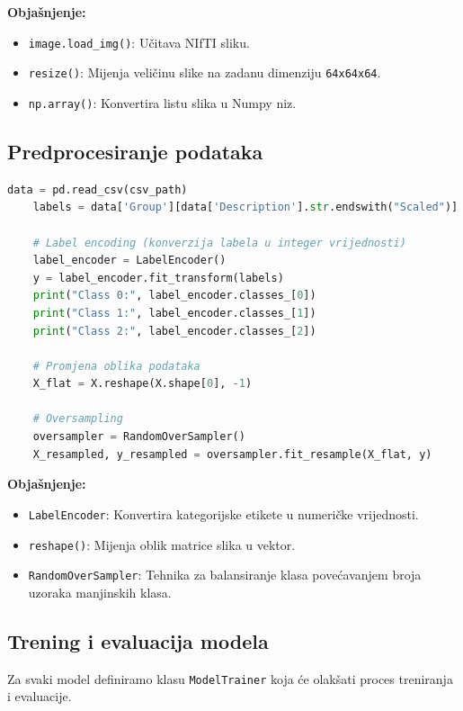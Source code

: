 \documentclass[zavrsnirad]{fer}
\begin{document}
\noindent \textbf{Objašnjenje:}
\begin{itemize}
	\item \texttt{image.load\_img()}: Učitava NIfTI sliku.
	\item \texttt{resize()}: Mijenja veličinu slike na zadanu dimenziju \texttt{64x64x64}.
	\item \texttt{np.array()}: Konvertira listu slika u Numpy niz.
\end{itemize}

\subsection{Predprocesiranje podataka}

\begin{lstlisting}[language=Python, caption={Predprocesiranje podataka}]
	data = pd.read_csv(csv_path)
	labels = data['Group'][data['Description'].str.endswith("Scaled")]
	
	# Label encoding (konverzija labela u integer vrijednosti)
	label_encoder = LabelEncoder()
	y = label_encoder.fit_transform(labels)
	print("Class 0:", label_encoder.classes_[0])
	print("Class 1:", label_encoder.classes_[1])
	print("Class 2:", label_encoder.classes_[2])
	
	# Promjena oblika podataka
	X_flat = X.reshape(X.shape[0], -1)
	
	# Oversampling
	oversampler = RandomOverSampler()
	X_resampled, y_resampled = oversampler.fit_resample(X_flat, y)
\end{lstlisting}

\noindent \textbf{Objašnjenje:}
\begin{itemize}
	\item \texttt{LabelEncoder}: Konvertira kategorijske etikete u numeričke vrijednosti.
	\item \texttt{reshape()}: Mijenja oblik matrice slika u vektor.
	\item \texttt{RandomOverSampler}: Tehnika za balansiranje klasa povećavanjem broja uzoraka manjinskih klasa.
\end{itemize}

\subsection{Trening i evaluacija modela}

Za svaki model definiramo klasu \texttt{ModelTrainer} koja će olakšati proces treniranja i evaluacije.
\end{document}
